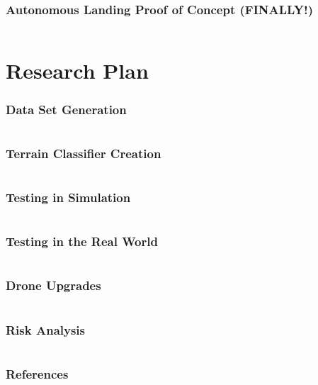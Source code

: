 \documentclass[aspectratio=169]{rubeamer}
\begin{document}
\begin{frame}
  \frametitle{Autonomous Landing Proof of Concept \textbf{(FINALLY!)}}
  \begin{columns}
    \centering
  \end{columns}
\end{frame}

\section{Research Plan}

\begin{frame}
  \frametitle{Data Set Generation}
  \begin{columns}
    \centering
  \end{columns}
\end{frame}

\begin{frame}
  \frametitle{Terrain Classifier Creation}
  \begin{columns}
    \centering
  \end{columns}
\end{frame}

\begin{frame}
  \frametitle{Testing in Simulation}
  \begin{columns}
    \centering
  \end{columns}
\end{frame}

\begin{frame}
  \frametitle{Testing in the Real World}
  \begin{columns}
    \centering
  \end{columns}
\end{frame}

\begin{frame}
  \frametitle{Drone Upgrades}
  \begin{columns}
    \centering
  \end{columns}
\end{frame}

\begin{frame}
  \frametitle{Risk Analysis}
  \begin{columns}
    \centering
  \end{columns}
\end{frame}

\begin{frame}[allowframebreaks]
  \frametitle{References}
  \printbibliography{}
\end{frame}
\end{document}
